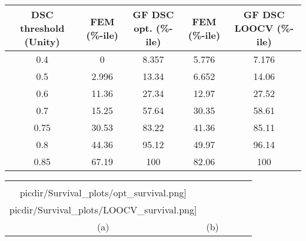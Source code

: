 \documentclass[12pt]{article}
\newif\iflatextortf
\newcommand{\picdir}{pdffig}
\begin{document}
\iflatextortf 
\else
\begin{table*}[p]
\caption{Here are the percentiles that correspond to several interesting DSC thresholds.
The ``opt." and ``LOOCV" columns refer to the same groups of datasets described in Table~\ref{DescriptiveStatistics},
as well as the datasets plotted in Figure~\ref{ModelSelection}.
The smaller the percentile value, the better the model's performance.
`0' indicates all values pass at the given threshold; `100' indicates no values pass.
}\label{DSC_and_percentiles}
\centering 
\begin{tabular}{c|cc|cc} \hline 
DSC threshold (Unity) &  FEM (\%-ile)& GF DSC opt. (\%-ile)  &  FEM (\%-ile) & GF DSC LOOCV (\%-ile) \\ \hline
      0.4             &    0         &     8.357             &      5.776    &    7.176              \\ %
      0.5             &    2.996     &     13.34             &      6.652    &    14.06              \\ %
      0.6             &    11.36     &     27.34             &      12.97    &    27.52              \\ \hline
      0.7             &    15.25     &     57.64             &      30.35    &    58.61              \\ %
      0.75            &    30.53     &     83.22             &      41.36    &    85.11              \\ %
      0.8             &    44.36     &     95.12             &      49.97    &    96.14              \\ %
      0.85            &    67.19     &     100               &      82.06    &    100                \\ %
\end{tabular}
\end{table*}
\fi

\begin{figure*}[p]
\begin{tabular}{ccccc}
\centering
\iflatextortf 
\else
\scalebox{0.5}{\texttt{[image: \\picdir/Survival\_plots/opt\_survival.png]}} &  \scalebox{0.485}{\texttt{[image: \\picdir/Survival\_plots/LOOCV\_survival.png]}}  
\fi
\\
(a) & (b) \\
\end{tabular}
\caption{
Here, the overall predictive performance, measured by DSC,
is displayed for both models. (a) Left is the performance during
optimization, and the right is during LOOCV (b).
The horizontal axis displays increasing
DSC thresholds; the vertical axis displays the number of datasets
that pass the DSC threshold. Greater area under the curve (AUC)
indicates better prediction. In the FEM LOOCV plot, there
is one dataset that has a DSC = 0 and therefore does not appear
on the plot.
}
\label{ModelSelection}
\end{figure*}
\end{document}
